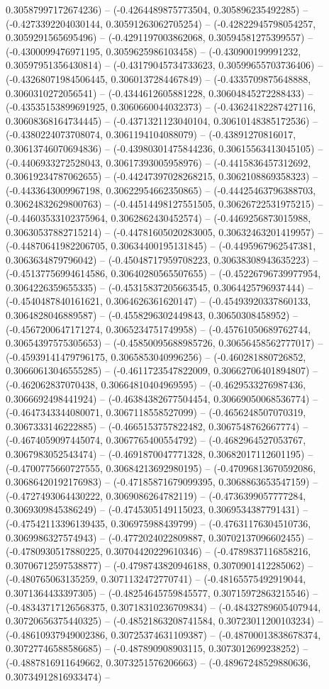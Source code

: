 0.30587997172674236) -- (-0.4264489875773504, 0.305896235492285) -- (-0.4273392204030144, 0.30591263062705254) -- (-0.42822945798054257, 0.3059291565695496) -- (-0.4291197003862068, 0.30594581275399557) -- (-0.4300099476971195, 0.3059625986103458) -- (-0.430900199991232, 0.30597951356430814) -- (-0.43179045734733623, 0.30599655703736406) -- (-0.43268071984506445, 0.3060137284467849) -- (-0.4335709875648888, 0.3060310272056541) -- (-0.4344612605881228, 0.30604845272288433) -- (-0.43535153899691925, 0.3060660044032373) -- (-0.43624182287427116, 0.30608368164734445) -- (-0.4371321123040104, 0.30610148385172536) -- (-0.4380224073708074, 0.3061194104088079) -- (-0.43891270816017, 0.30613746070694836) -- (-0.43980301475844236, 0.30615563413045105) -- (-0.4406933272528043, 0.30617393005958976) -- (-0.4415836457312692, 0.30619234787062655) -- (-0.44247397028268215, 0.3062108869358323) -- (-0.4433643009967198, 0.30622954662350865) -- (-0.44425463796388703, 0.30624832629800763) -- (-0.44514498127551505, 0.30626722531975215) -- (-0.44603533102375964, 0.3062862430452574) -- (-0.4469256873015988, 0.30630537882715214) -- (-0.44781605020283005, 0.30632463201419957) -- (-0.44870641982206705, 0.30634400195131845) -- (-0.4495967962547381, 0.3063634879796042) -- (-0.45048717959708223, 0.30638308943635223) -- (-0.45137756994614586, 0.30640280565507655) -- (-0.45226796739977954, 0.3064226359655335) -- (-0.45315837205663545, 0.3064425796937444) -- (-0.4540487840161621, 0.3064626361620147) -- (-0.45493920337860133, 0.3064828046889587) -- (-0.4558296302449843, 0.30650308458952) -- (-0.4567200647171274, 0.3065234751749958) -- (-0.45761050689762744, 0.30654397575305653) -- (-0.45850095688985726, 0.30656458562777017) -- (-0.45939141479796175, 0.3065853040996256) -- (-0.460281880726852, 0.30660613046555285) -- (-0.4611723547822009, 0.30662706401894807) -- (-0.462062837070438, 0.30664810404969595) -- (-0.4629533276987436, 0.3066692498441924) -- (-0.46384382677504454, 0.30669050068536774) -- (-0.4647343344080071, 0.3067118558527099) -- (-0.4656248507070319, 0.3067333146222885) -- (-0.4665153757822482, 0.3067548762667774) -- (-0.4674059097445074, 0.3067765400554792) -- (-0.4682964527053767, 0.3067983052543474) -- (-0.4691870047771328, 0.30682017112601195) -- (-0.4700775660727555, 0.30684213692980195) -- (-0.47096813670592086, 0.30686420192176983) -- (-0.47185871679099395, 0.3068863653547159) -- (-0.4727493064430222, 0.3069086264782119) -- (-0.4736399057777284, 0.3069309845386249) -- (-0.4745305149115023, 0.3069534387791431) -- (-0.47542113396139435, 0.306975988439799) -- (-0.47631176304510736, 0.3069986327574943) -- (-0.4772024022809887, 0.30702137096602455) -- (-0.4780930517880225, 0.30704420229610346) -- (-0.4789837116858216, 0.30706712597538877) -- (-0.4798743820946188, 0.3070901412285062) -- (-0.480765063135259, 0.3071132472770741) -- (-0.48165575492919044, 0.3071364433397305) -- (-0.48254645759845577, 0.30715972863215546) -- (-0.48343717126568375, 0.30718310236709834) -- (-0.48432789605407944, 0.30720656375440325) -- (-0.48521863208741584, 0.30723011200103234) -- (-0.48610937949002386, 0.30725374631109387) -- (-0.48700013838678374, 0.30727746588586685) -- (-0.487890908903115, 0.3073012699238252) -- (-0.4887816911649662, 0.3073251576206663) -- (-0.48967248529880636, 0.30734912816933474) -- 